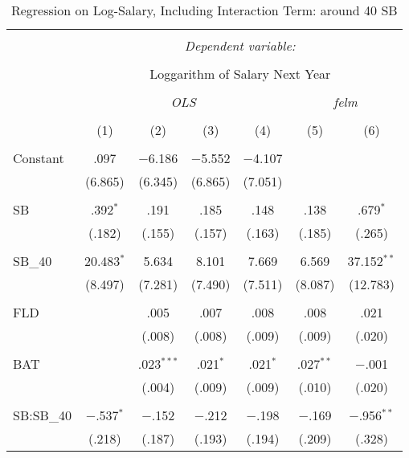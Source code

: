 
\begin{table}[H] \centering
  \caption{Regression on Log-Salary, Including Interaction Term: around 40 SB}
  \label{SB40_A}
\tiny
\begin{tabular}{@{\extracolsep{5pt}}lcccccc}
\\[-1.8ex]\hline
\hline \\[-1.8ex]
 & \multicolumn{6}{c}{\textit{Dependent variable:}} \\
\cline{2-7}
\\[-1.8ex] & \multicolumn{6}{c}{Loggarithm of Salary Next Year} \\
\\[-1.8ex] & \multicolumn{4}{c}{\textit{OLS}} & \multicolumn{2}{c}{\textit{felm}} \\
\\[-1.8ex] & (1) & (2) & (3) & (4) & (5) & (6)\\
\hline \\[-1.8ex]
 Constant & .097 & $-$6.186 & $-$5.552 & $-$4.107 &  &  \\
  & (6.865) & (6.345) & (6.865) & (7.051) &  &  \\
  & & & & & & \\
 SB & .392$^{*}$ & .191 & .185 & .148 & .138 & .679$^{*}$ \\
  & (.182) & (.155) & (.157) & (.163) & (.185) & (.265) \\
  & & & & & & \\
 SB\_40 & 20.483$^{*}$ & 5.634 & 8.101 & 7.669 & 6.569 & 37.152$^{**}$ \\
  & (8.497) & (7.281) & (7.490) & (7.511) & (8.087) & (12.783) \\
  & & & & & & \\
 FLD &  & .005 & .007 & .008 & .008 & .021 \\
  &  & (.008) & (.008) & (.009) & (.009) & (.020) \\
  & & & & & & \\
 BAT &  & .023$^{***}$ & .021$^{*}$ & .021$^{*}$ & .027$^{**}$ & $-$.001 \\
  &  & (.004) & (.009) & (.009) & (.010) & (.020) \\
  & & & & & & \\
 SB:SB\_40 & $-$.537$^{*}$ & $-$.152 & $-$.212 & $-$.198 & $-$.169 & $-$.956$^{**}$ \\
  & (.218) & (.187) & (.193) & (.194) & (.209) & (.328) \\

\end{tabular}
\end{table}
